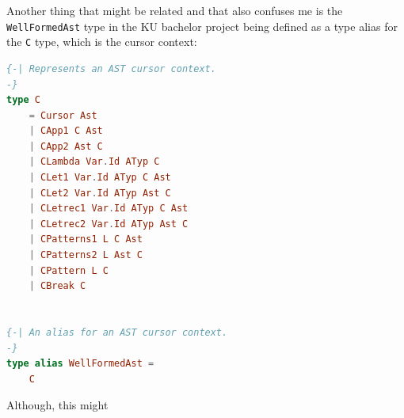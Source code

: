 \documentclass{article}
\begin{document}
Another thing that might be related and that also confuses me is the \texttt{WellFormedAst} type in the KU bachelor project being defined as a type alias for the \texttt{C} type, which is the cursor context:

\begin{lstlisting}[style=inline,language=elm]
{-| Represents an AST cursor context.
-}
type C
    = Cursor Ast
    | CApp1 C Ast
    | CApp2 Ast C
    | CLambda Var.Id ATyp C
    | CLet1 Var.Id ATyp C Ast
    | CLet2 Var.Id ATyp Ast C
    | CLetrec1 Var.Id ATyp C Ast
    | CLetrec2 Var.Id ATyp Ast C
    | CPatterns1 L C Ast
    | CPatterns2 L Ast C
    | CPattern L C
    | CBreak C


{-| An alias for an AST cursor context.
-}
type alias WellFormedAst =
    C
\end{lstlisting}

Although, this might 

\printbibliography
\end{document}
